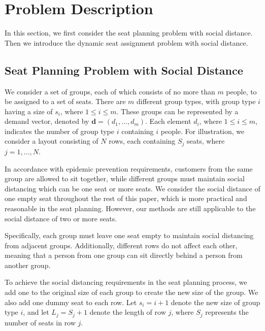 \section{Problem Description}
In this section, we first consider the seat planning problem with social distance. Then we introduce the dynamic seat assignment problem with social distance.





\subsection{Seat Planning Problem with Social Distance}\label{dynamic_demand}
We consider a set of groups, each of which consists of no more than $m$ people, to be assigned to a set of seats. There are $m$ different group types, with group type $i$ having a size of $s_i$, where $1 \leq i \leq m$. These groups can be represented by a demand vector, denoted by $\mathbf{d} = (d_1, \ldots, d_m)$. Each element $d_i$, where $1 \leq i \leq m$, indicates the number of group type $i$ containing $i$ people. For illustration, we consider a layout consisting of $N$ rows, each containing $S_j$ seats, where $j = 1, \ldots, N$.

In accordance with epidemic prevention requirements, customers from the same group are allowed to sit together, while different groups must maintain social distancing which can be one seat or more seats. We consider the social distance of one empty seat throughout the rest of this paper, which is more practical and reasonable in the seat planning. However, our methods are still applicable to the social distance of two or more seats.

Specifically, each group must leave one seat empty to maintain social distancing from adjacent groups. Additionally, different rows do not affect each other, meaning that a person from one group can sit directly behind a person from another group.

To achieve the social distancing requirements in the seat planning process, we add one to the original size of each group to create the new size of the group. We also add one dummy seat to each row. Let $s_i = i + 1$ denote the new size of group type $i$, and let $L_j = S_j + 1$ denote the length of row $j$, where $S_j$ represents the number of seats in row $j$.

